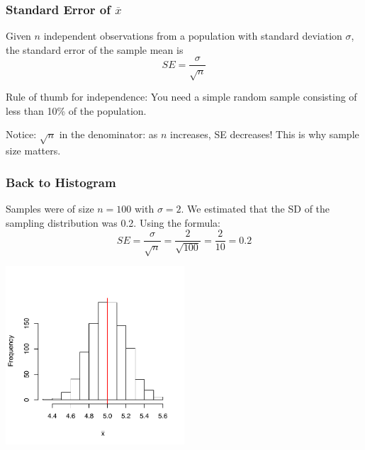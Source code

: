 \documentclass[handout]{beamer}
\newcommand{\blue}[1]{\textcolor{blue2}{#1}}
\newcommand{\xbar}{\overline{x}}
\begin{document}
\begin{frame}[fragile]
\frametitle{Standard Error of $\xbar$}

Given $n$ \blue{independent} observations from a population with standard deviation $\sigma$, the \blue{standard error of the sample mean} is
\[
SE = \frac{\sigma}{\sqrt{n}}
\]

\pause \blue{Rule of thumb for independence}:  You need a simple random sample consisting of less than 10\% of the population.  

\vspace{0.5cm}
\blue{Notice}: $\sqrt{n}$ in the denominator: as $n$ increases, SE decreases! This is why sample size matters.

\end{frame}


\begin{frame}[fragile]
\frametitle{Back to Histogram}
Samples were of size $n=100$ with $\sigma=2$.  We estimated that the SD of the sampling distribution was 0.2.  Using the formula:
\[
SE = \frac{\sigma}{\sqrt{n}} = \frac{2}{\sqrt{100}} = \frac{2}{10} = 0.2
\]
\begin{center}
\includegraphics[width=0.5\textwidth]{figure/lec12-001}
\end{center}


\end{frame}
\end{document}
